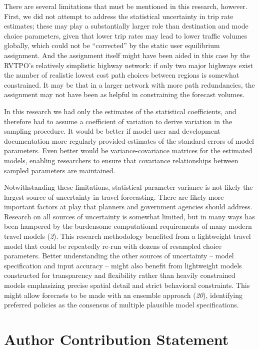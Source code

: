 \documentclass[
  letterpaper,
]{trb}
\begin{document}
There are several limitations that must be mentioned in this research,
however. First, we did not attempt to address the statistical
uncertainty in trip rate estimates; these may play a substantially
larger role than destination and mode choice parameters, given that
lower trip rates may lead to lower traffic volumes globally, which could
not be ``corrected'' by the static user equilibrium assignment. And the
assignment itself might have been aided in this case by the RVTPO's
relatively simplistic highway network: if only two major highways exist
the number of realistic lowest cost path choices between regions is
somewhat constrained. It may be that in a larger network with more path
redundancies, the assignment may not have been as helpful in
constraining the forecast volumes.

In this research we had only the estimates of the statistical
coefficients, and therefore had to assume a coefficient of variation to
derive variation in the sampling procedure. It would be better if model
user and development documentation more regularly provided estimates of
the standard errors of model parameters. Even better would be
variance-covariance matrices for the estimated models, enabling
researchers to ensure that covariance relationships between sampled
parameters are maintained.

Notwithstanding these limitations, statistical parameter variance is not
likely the largest source of uncertainty in travel forecasting. There
are likely more important factors at play that planners and government
agencies should address. Research on all sources of uncertainty is
somewhat limited, but in many ways has been hampered by the burdensome
computational requirements of many modern travel models (\emph{2}). This
research methodology benefited from a lightweight travel model that
could be repeatedly re-run with dozens of resampled choice parameters.
Better understanding the other sources of uncertainty -- model
specification and input accuracy -- might also benefit from lightweight
models constructed for transparency and flexibility rather than heavily
constrained models emphasizing precise spatial detail and strict
behavioral constraints. This might allow forecasts to be made with an
ensemble approach (\emph{20}), identifying preferred policies as the
consensus of multiple plausible model specifications.


\hypertarget{author-contribution-statement}{%
\section*{Author Contribution
Statement}\label{author-contribution-statement}}
\end{document}

